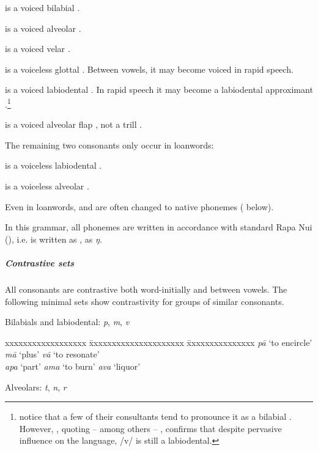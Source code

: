  is a voiced bilabial .

 is a voiced alveolar .

 is a voiced velar . 

 is a voiceless glottal . Between vowels, it may become voiced in rapid speech.

 is a voiced labiodental . In rapid speech it may become a labiodental approximant \textstyleIPA{[ʋ]}.\footnote{\label{fn:31}\citet[14]{GuerraEissmann1993} notice that a few of their consultants tend to pronounce it as a bilabial . However, \citet[317–318]{Fischer2001Hispan}, quoting – among others – \citet{WeberWeber1982}, confirms that despite pervasive  influence on the language, /v/ is still a labiodental.}

 is a voiced alveolar flap \textstyleIPA{[ɾ]}, not a trill \textstyleIPA{[r]}.

The remaining two consonants only occur in loanwords: 

 is a voiceless labiodental . 

 is a voiceless alveolar . 

Even in loanwords,  and  are often changed to native phonemes ( below).

In this grammar, all phonemes are written in accordance with standard Rapa Nui  (), i.e.  is written as \textit{{\ꞌ}},  as \textit{ŋ}.

\subparagraph{Contrastive sets} All consonants are contrastive both word-initially and between vowels. The following minimal sets show contrastivity for groups of similar consonants.

\newpage 
Bilabials and labiodental: \textit{p}, \textit{m}, \textit{v}

\ea
\begin{tabbing}
 xxxxxxxxxxxxxxxxxx \= xxxxxxxxxxxxxxxxxxxxx \= xxxxxxxxxxxxxxx \kill
 \textit{pā} ‘to encircle’  \> \textit{mā} ‘plus’  \> \textit{vā} ‘to resonate’\\
 \textit{{\ꞌ}apa} ‘part’  \> \textit{{\ꞌ}ama} ‘to burn’ \>  \textit{{\ꞌ}ava} ‘liquor’
\end{tabbing}
\z 
Alveolars: \textit{t}, \textit{n}, \textit{r}

